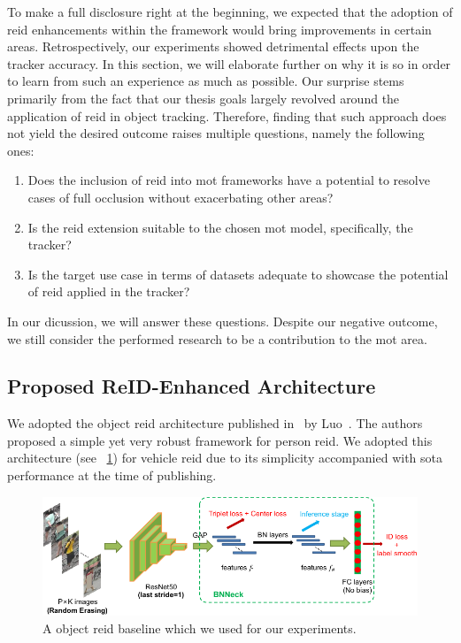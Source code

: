 To make a full disclosure right at the beginning, we expected that the adoption of \gls{reid} enhancements within the \siammot{} framework would bring improvements in certain areas. Retrospectively, our experiments showed detrimental effects upon the tracker accuracy. In this section, we will elaborate further on why it is so in order to learn from such an experience as much as possible. Our surprise stems primarily from the fact that our thesis goals largely revolved around the application of \gls{reid} in object tracking. Therefore, finding that such approach does not yield the desired outcome raises multiple questions, namely the following ones:
\begin{enumerate}
    \item Does the inclusion of \gls{reid} into \gls{mot} frameworks have a potential to resolve cases of full occlusion without exacerbating other areas?
    \item Is the \gls{reid} extension suitable to the chosen \gls{mot} model, specifically, the \siammot{} tracker?
    \item Is the target use case in terms of datasets adequate to showcase the potential of \gls{reid} applied in the \siammot{} tracker?
\end{enumerate}
In our dicussion, we will answer these questions. Despite our negative outcome, we still consider the performed research to be a contribution to the \gls{mot} area.

\subsection{Proposed ReID-Enhanced Architecture}
\label{ssec:ProposedReIDEnhancedArchitecture}

We adopted the object \gls{reid} architecture published in~\cite{luo2019bagoftricksreid} by Luo~\etal{}. The authors proposed a simple yet very robust framework for person \gls{reid}. We adopted this architecture (see \figtext{}~\ref{fig:BagOfTricksReIDArchitecture}) for vehicle \gls{reid} due to its simplicity accompanied with \gls{sota} performance at the time of publishing.

\begin{figure}[!t]
    \centering
    \includegraphics[width=\linewidth]{figures/siamese_tracking/bagoftricks_reid_architecture.pdf}
    \caption[Gls{reid} baseline]{A object \gls{reid} baseline which we used for our experiments. }
    \label{fig:BagOfTricksReIDArchitecture}
\end{figure}

